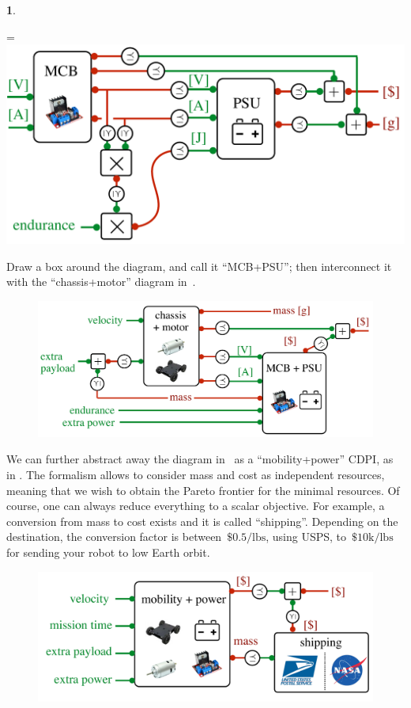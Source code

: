 \documentclass[twocolumn,english]{IEEEtran}
\theoremstyle{definition}
\theoremstyle{plain}
\theoremstyle{definition}
\newtheorem{example}{\protect\examplename}
\theoremstyle{remark}
\theoremstyle{definition}
\theoremstyle{plain}
\theoremstyle{plain}
\newcommand{\colR}{\color[rgb]{0.555789,0.000000,0.000000}}
\newcommand{\R}[1]{{\colR #1}}
\newcommand*{\vcenteredhbox}[1]{\begingroup
\setbox0=\hbox{#1}\parbox{\wd0}{\box0}\endgroup}
\newcommand{\captionsideleft}[2]{
    \medskip
    \begin{minipage}{1.8cm}{
        \hfill
        \protect\captionof{figure}{#1}}\end{minipage}
    \begin{minipage}{6.6cm}
    
    \vcenteredhbox{{#2}}
    \hfill
    \end{minipage}
    \medskip
}
\providecommand{\examplename}{Example}
\begin{document}
\begin{example}
\captionsideleft{\label{fig:connect}}{\includegraphics[scale=0.29]{gmcdp_MCB_PSU_2}}

\noindent Draw a box around the diagram, and call it ``MCB+PSU'';
then interconnect it with the ``chassis+motor'' diagram in~.

\noindent 
\begin{figure}[H]
\begin{centering}
\includegraphics[scale=0.33]{gmcdp_mobility_power}
\par\end{centering}
\caption{\label{fig:another}}
\end{figure}

We can further abstract away the diagram in~ as
a ``mobility+power'' CDPI, as in . The formalism
allows to consider \R{mass} and \R{cost} as independent resources,
meaning that we wish to obtain the Pareto frontier for the minimal
resources. Of course, one can always reduce everything to a scalar
objective. For example, a conversion from mass to cost exists and
it is called ``shipping''. Depending on the destination, the conversion
factor is between~$\$0.5/\mbox{lbs}$, using USPS, to~$\$10\mbox{k}/\mbox{lbs}$
for sending your robot to low Earth orbit. 

\noindent 
\begin{figure}[H]
\centering{}\includegraphics[scale=0.33]{gmcdp_shipping}\caption{\label{fig:shipping}}
\end{figure}


\end{example}
\end{document}
